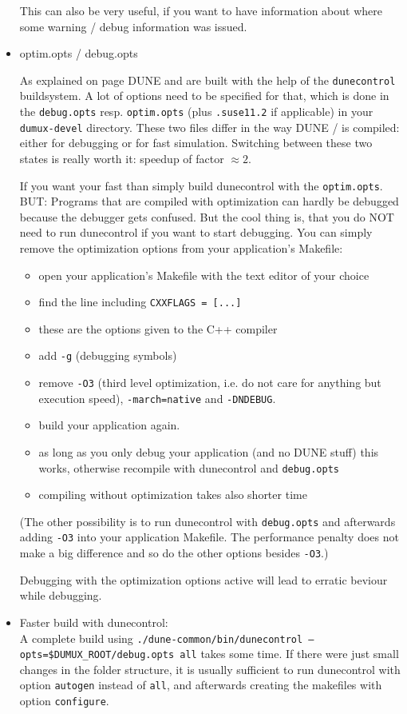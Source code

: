 \begin{itemize}
This can also be very useful, if you want to have information about where some warning / debug information was issued. 

\item optim.opts / debug.opts

As explained on page \pageref{buildIt} DUNE and \Dumux are built with the help of the \verb+dunecontrol+ buildsystem. 
A lot of options need to be specified for that, which is done in the \verb+debug.opts+ resp. \verb+optim.opts+ 
(plus \verb+.suse11.2+ if applicable) in your \verb+dumux-devel+ directory. These two files differ in the way DUNE / \Dumux is compiled: either for debugging or for fast simulation. Switching between these two states is really 
worth it: speedup of factor $\approx 2$. 

If you want your \Dumux fast than simply build dunecontrol with the \verb+optim.opts+. BUT: Programs that are compiled with optimization can hardly 
be debugged because the debugger gets confused. But the cool thing is, that you do NOT need to run dunecontrol if you want to start debugging. You can simply remove the optimization options from your application's Makefile:
\begin{itemize}
\item open your application's Makefile with the text editor of your choice
\item find the line including \verb+CXXFLAGS = [...]+
\item these are the options given to the C++ compiler
\item add \verb+-g+ (debugging symbols)
\item remove  \verb+-O3+ (third level optimization, i.e. do not care for anything but execution speed),  \verb+-march=native+ and \verb+-DNDEBUG+.
\item build your application again. 
\item as long as you only debug your application (and no DUNE stuff) this works, otherwise recompile with dunecontrol and \verb+debug.opts+
\item compiling without optimization takes also shorter time
\end{itemize}

(The other possibility is to run dunecontrol with \verb+debug.opts+ and afterwards adding \verb+-O3+ into your application Makefile. The performance  penalty does not make a big difference and so do the other options besides \verb+-O3+.)

Debugging with the optimization options active will lead to erratic beviour while debugging. 

\item Faster build with dunecontrol:\\
A complete build using \texttt{./dune-common/bin/dunecontrol --opts=\$DUMUX\_ROOT/debug.opts all} takes some time. If there were just small changes in the folder structure, it is usually sufficient to run dunecontrol with option \texttt{autogen} instead of \texttt{all}, and afterwards creating the makefiles with option \texttt{configure}.

\end{itemize}

